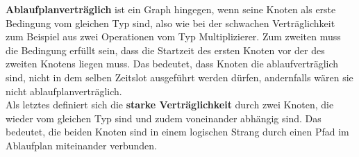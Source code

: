 \documentclass[conference]{IEEEtran}
\begin{document}
\textbf{Ablaufplanverträglich} ist ein Graph hingegen, wenn seine Knoten als erste Bedingung vom gleichen Typ sind, also wie bei der schwachen Verträglichkeit zum Beispiel aus zwei Operationen vom Typ Multiplizierer. Zum zweiten muss die Bedingung erfüllt sein, dass die Startzeit des ersten Knoten vor der des zweiten Knotens liegen muss. Das bedeutet, dass Knoten die ablaufverträglich sind, nicht in dem selben Zeitslot ausgeführt werden dürfen, andernfalls wären sie nicht ablaufplanverträglich\cite[S. 182]{1}.\\

Als letztes definiert sich die \textbf{starke Verträglichkeit} durch zwei Knoten, die wieder vom gleichen Typ sind und zudem voneinander abhängig sind. Das bedeutet, die beiden Knoten sind in einem logischen Strang durch einen Pfad im Ablaufplan miteinander verbunden.\cite[S. 182]{1}
\end{document}
